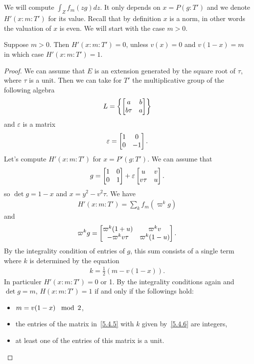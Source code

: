 \subsection{}
We will compute $\int_Z f_m(zg) dz$.
It only depends on $x = P(g:T')$ and we denote $H'(x:m:T')$ for its value.
Recall that by definition $x$ is a norm, in other words the valuation of $x$ is even.
We will start with the case $m > 0$.
\begin{proposition}\label{prop:5.4}
    Suppose $m > 0$.
    Then $H'(x:m:T')=0$, unless $v(x) = 0$ and $v(1-x)=m$ in which case $H'(x:m:T')=1$.
\end{proposition}
\begin{proof}
We can assume that $E$ is an extension generated by the square root of $\tau$, where $\tau$ is a unit.
Then we can take for $T'$ the multiplicative group of the following algebra
\begin{align}
    L = \left\{\begin{bmatrix} a & b \\ b\tau & a \end{bmatrix}\right\}
\end{align}
and $\varepsilon$ is a matrix
\begin{align}
    \varepsilon = \begin{bmatrix} 1 & 0 \\ 0 & -1 \end{bmatrix}.
\end{align}
Let's compute $H'(x:m:T')$ for $x = P'(g:T')$.
We can assume that 
\begin{align}
    g = \begin{bmatrix} 1 & 0 \\ 0 & 1 \end{bmatrix} + \varepsilon \begin{bmatrix} u & v \\ v\tau & u \end{bmatrix}.
\end{align}
so $\det g = 1 - x$ and $x = y^2 - v^2 \tau$.
We have
\begin{align}
    H'(x:m:T') = \sum_{k}f_{m}(\varpi^k g)
\end{align}
and
\begin{align}
    \label{5.4.5}
    \varpi^k g = \begin{bmatrix} \varpi^k(1+u) & \varpi^k v \\ -\varpi^k v\tau & \varpi^k(1-u) \end{bmatrix}.
\end{align}
By the integrality condition of entries of $g$, this sum consists of a single term where $k$ is determined by the equation
\begin{align}
    \label{5.4.6}
    k = \frac{1}{2}(m - v(1-x)).
\end{align}
In particuler $H'(x:m:T') = 0$ or 1.
By the integrality conditions again and $\det g = m$, $H(x:m:T') = 1$ if and only if the followings hold:
\begin{itemize}
    \item $m = v(1-x) \,\mathrm{\mod}\,2$,
    \item the entries of the matrix in~\eqref{5.4.5} with $k$ given by~\eqref{5.4.6} are integers,
    \item at least one of the entries of this matrix is a unit.

\end{itemize}
\end{proof}
